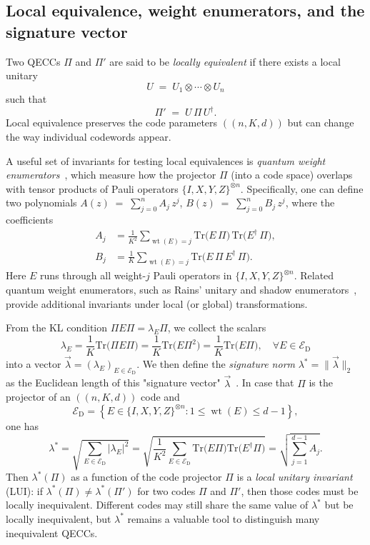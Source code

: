 \documentclass[8pt]{article}
\theoremstyle{definition}
\newcommand{\proj}{\Pi}
\newcommand{\edset}{\mathcal{E}_\textrm{D}}
\newcommand{\trace}{\mathrm{Tr}}
\begin{document}
\subsection{Local equivalence, weight enumerators, and the signature vector}

Two QECCs \(\proj\) and \(\proj'\) are said to be \emph{locally equivalent} if there exists a local unitary
\[ U \;=\; U_1\otimes \cdots \otimes U_n \]
such that
\[ \proj' \;=\; U\,\proj\,U^\dagger. \]
Local equivalence preserves the code parameters \(((n,K,d))\) but can change the way individual codewords appear.

A useful set of invariants for testing local equivalences is \emph{quantum weight enumerators}~\cite{shor1997quantum}, which measure how the projector \(\Pi\) (into a code space) overlaps with tensor products of Pauli operators \(\{I,X,Y,Z\}^{\otimes n}\). Specifically, one can define two polynomials $A(z) \;=\; \sum_{j=0}^n A_j \, z^j$,
$B(z) \;=\; \sum_{j=0}^n B_j \, z^j$,
where the coefficients
\begin{align}
    A_j &= \frac{1}{K^2}\sum_{\operatorname{wt}(E)=j} \trace\bigl(E\,\proj\bigr)\,\trace\bigl(E^{\dagger}\,\proj\bigr),\\
    B_j &= \frac{1}{K}\sum_{\operatorname{wt}(E)=j} \trace\bigl(E\,\proj\,E^{\dagger}\,\proj\bigr).
\end{align}
Here \(E\) runs through all weight-$j$ Pauli operators in $\{I,X,Y,Z\}^{\otimes n}$.
Related quantum weight enumerators, such as Rains' unitary and shadow enumerators~\cite{rains1998quantum,rains1999quantum,miller2024experimental}, provide additional invariants under local (or global) transformations.

From the KL condition $\proj E \proj = \lambda_E \proj$, we collect the scalars \[\lambda_E = \frac{1}{K} \trace\bigl(\proj E \proj\bigr)
    = \frac{1}{K} \trace\bigl(E \proj^2\bigr) = \frac{1}{K} \trace\bigl(E \proj\bigr),\quad \forall E \in \edset\]  into a vector
$\vec\lambda = (\lambda_E)_{E\in\edset}$.
We then define the \emph{signature norm} $\lambda^* = \|\vec\lambda\|_2$ as the Euclidean length of this "signature vector" \(\vec\lambda\)~\cite{du2024characterizing}. In case that $\proj$ is the projector of an $((n,K,d))$ code and \[\edset = \left\{E \in \{I,X,Y,Z\}^{\otimes n}: 1 \le \operatorname{wt}(E) \le d-1\right\},\]
one has
\[
    \lambda^* =  \sqrt{\sum_{E \in \edset} |\lambda_E|^2} = \sqrt{\frac{1}{K^2}\sum_{E \in \edset} \trace\bigl(E\proj\bigr) \trace\bigl(E^\dagger\proj\bigr)} = \sqrt{\sum_{j=1}^{d-1} A_j}.
\]
Then \(\lambda^*(\Pi)\) as a function of the code  projector $\proj$ is a \emph{local unitary invariant} (LUI): if \(\lambda^*(\proj)\neq \lambda^*(\proj')\) for two codes \(\proj\) and \(\proj'\), then those codes must be locally inequivalent.
Different codes may still share the same value of \(\lambda^*\) but be locally inequivalent, but \(\lambda^*\) remains a valuable tool to distinguish many inequivalent QECCs.
\end{document}
